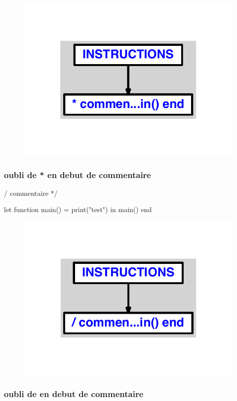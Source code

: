 \documentclass{article}
\begin{document}
\begin{figure}[H]\centering\includegraphics[max width=\textwidth]{ast/ast_144.pdf}\end{figure}\subsubsection{oubli de * en debut de commentaire}
\begin{verbatimtab}
/ commentaire */

let
	function main() = print("test")
in main() end
\end{verbatimtab}
\begin{figure}[H]\centering\includegraphics[max width=\textwidth]{ast/ast_145.pdf}\end{figure}\subsubsection{oubli de  en debut de commentaire}
\end{document}
